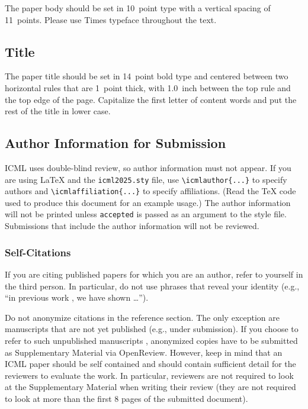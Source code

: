 \documentclass{article}
\theoremstyle{plain}
\theoremstyle{definition}
\theoremstyle{remark}
\begin{document}
The paper body should be set in 10~point type with a vertical spacing
of 11~points. Please use Times typeface throughout the text.

\subsection{Title}

The paper title should be set in 14~point bold type and centered
between two horizontal rules that are 1~point thick, with 1.0~inch
between the top rule and the top edge of the page. Capitalize the
first letter of content words and put the rest of the title in lower
case.

\subsection{Author Information for Submission}
\label{author info}

ICML uses double-blind review, so author information must not appear. If
you are using \LaTeX\/ and the \texttt{icml2025.sty} file, use
\verb+\icmlauthor{...}+ to specify authors and \verb+\icmlaffiliation{...}+
to specify affiliations. (Read the TeX code used to produce this document for
an example usage.) The author information will not be printed unless
\texttt{accepted} is passed as an argument to the style file. Submissions that
include the author information will not be reviewed.

\subsubsection{Self-Citations}

If you are citing published papers for which you are an author, refer
to yourself in the third person. In particular, do not use phrases
that reveal your identity (e.g., ``in previous work \cite{langley00}, we
have shown \ldots'').

Do not anonymize citations in the reference section. The only exception are manuscripts that are
not yet published (e.g., under submission). If you choose to refer to
such unpublished manuscripts \cite{anonymous}, anonymized copies have
to be submitted
as Supplementary Material via OpenReview\@. However, keep in mind that an ICML
paper should be self contained and should contain sufficient detail
for the reviewers to evaluate the work. In particular, reviewers are
not required to look at the Supplementary Material when writing their
review (they are not required to look at more than the first $8$ pages of the submitted document).
\end{document}
